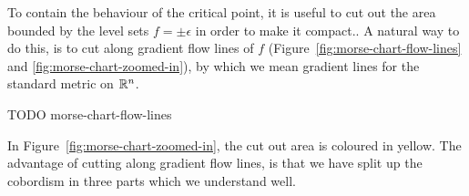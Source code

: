 \begin{figure}[H]
    \centering
\end{figure}

To contain the behaviour of the critical point, it is useful to cut out the area bounded by the level sets $f = \pm \epsilon$ in order to make it compact..
A natural way to do this, is to cut along gradient flow lines of $f$ (Figure~\ref{fig:morse-chart-flow-lines} and \ref{fig:morse-chart-zoomed-in}), by which we mean gradient lines for the standard metric on $\mathbb{R}^{n}$.
\begin{marginfigure}
    \centering
    \caption{TODO morse-chart-flow-lines}
    \label{fig:morse-chart-flow-lines}
\end{marginfigure}
In Figure~\ref{fig:morse-chart-zoomed-in}, the cut out area is coloured in yellow.
The advantage of cutting along gradient flow lines, is that we have split up the cobordism in three parts which we understand well.
